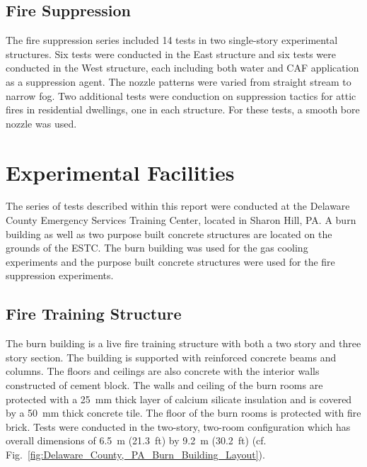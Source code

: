 \documentclass[12pt,oneside]{book}
\begin{document}
\subsection{Fire Suppression}
\label{sec:desc_Fire_Suppression}

The fire suppression series included 14 tests in two single-story experimental structures. Six tests were conducted in the East structure and six tests were conducted in the West structure, each including both water and CAF application as a suppression agent. The nozzle patterns were varied from straight stream to narrow fog. Two additional tests were conduction on suppression tactics for attic fires in residential dwellings, one in each structure. For these tests, a smooth bore nozzle was used.




\section{Experimental Facilities}
\label{sec:Experimental_Facility}

The series of tests described within this report were conducted at the Delaware County Emergency Services Training Center, located in Sharon Hill, PA. A burn building as well as two purpose built concrete structures are located on the grounds of the ESTC. The burn building was used for the gas cooling experiments and the purpose built concrete structures were used for the fire suppression experiments.

\subsection{Fire Training Structure}
\label{sec:Burn_Building}

The burn building is a live fire training structure with both a two story and three story section. The building is supported with reinforced concrete beams and columns. The floors and ceilings are also concrete with the interior walls constructed of cement block. The walls and ceiling of the burn rooms are protected with a 25~mm thick layer of calcium silicate insulation and is covered by a 50~mm thick concrete tile. The floor of the burn rooms is protected with fire brick. Tests were conducted in the two-story, two-room configuration which has overall dimensions of 6.5~m (21.3~ft) by 9.2~m (30.2~ft) (cf. Fig.~\ref{fig:Delaware_County,_PA_Burn_Building_Layout}).
\end{document}
